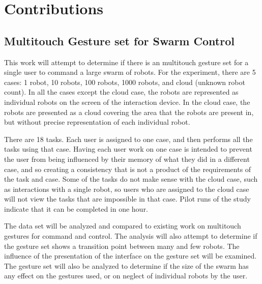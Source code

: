\section{Contributions}

\subsection{Multitouch Gesture set for Swarm Control}
This work will attempt to determine if there is an multitouch gesture set for a single user to command a large swarm of robots.
For the experiment, there are 5 cases: 1 robot, 10 robots, 100 robots, 1000 robots, and cloud (unknown robot count). 
In all the cases except the cloud case, the robots are represented as individual robots on the screen of the interaction device. 
In the cloud case, the robots are presented as a cloud covering the area that the robots are present in, but without precise representation of each individual robot. 

There are 18 tasks. 
Each user is assigned to one case, and then performs all the tasks using that case. 
Having each user work on one case is intended to prevent the user from being influenced by their memory of what they did in a different case, and so creating a consistency that is not a product of the requirements of the task and case. 
Some of the tasks do not make sense with the cloud case, such as interactions with a single robot, so users who are assigned to the cloud case will not view the tasks that are impossible in that case.
Pilot runs of the study indicate that it can be completed in one hour. 

The data set will be analyzed and compared to existing work on multitouch gestures for command and control. 
The analysis will also attempt to determine if the gesture set shows a transition point between many and few robots. 
The influence of the presentation of the interface on the gesture set will be examined. 
The gesture set will also be analyzed to determine if the size of the swarm has any effect on the gestures used, or on neglect of individual robots by the user. 

